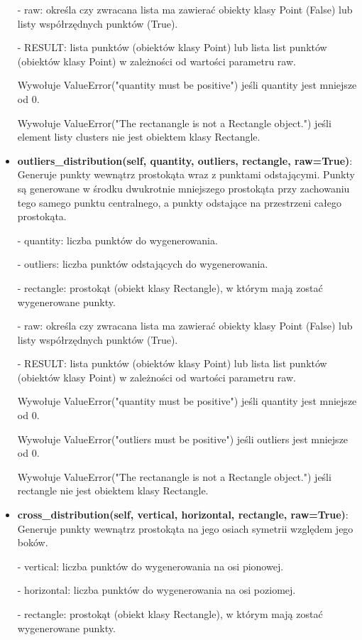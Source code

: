 \documentclass{lab}
\begin{document}
\begin{itemize}
  - raw: określa czy zwracana lista ma zawierać obiekty klasy Point (False) lub listy współrzędnych punktów (True).

  - RESULT: lista punktów (obiektów klasy Point) lub lista list punktów (obiektów klasy Point) w zależności od wartości parametru raw.

  Wywołuje ValueError("quantity must be positive") jeśli quantity jest mniejsze od 0.

  Wywołuje ValueError("The rectanangle is not a Rectangle object.") jeśli element listy clusters nie jest obiektem klasy Rectangle.

  \item \textbf{outliers\_distribution(self, quantity, outliers, rectangle, raw=True)}:
  Generuje punkty wewnątrz prostokąta wraz z punktami odstającymi. Punkty są generowane w środku dwukrotnie mniejszego prostokąta przy zachowaniu tego samego punktu centralnego, a punkty odstające na przestrzeni całego prostokąta.

  - quantity: liczba punktów do wygenerowania.

  - outliers: liczba punktów odstających do wygenerowania.

  - rectangle: prostokąt (obiekt klasy Rectangle), w którym mają zostać wygenerowane punkty.

  - raw: określa czy zwracana lista ma zawierać obiekty klasy Point (False) lub listy współrzędnych punktów (True).

  - RESULT: lista punktów (obiektów klasy Point) lub lista list punktów (obiektów klasy Point) w zależności od wartości parametru raw.

  Wywołuje ValueError("quantity must be positive") jeśli quantity jest mniejsze od 0.

  Wywołuje ValueError("outliers must be positive") jeśli outliers jest mniejsze od 0.

  Wywołuje ValueError("The rectanangle is not a Rectangle object.") jeśli rectangle nie jest obiektem klasy Rectangle.

  \item \textbf{cross\_distribution(self, vertical, horizontal, rectangle, raw=True)}:
  Generuje punkty wewnątrz prostokąta na jego osiach symetrii względem jego boków.

  - vertical: liczba punktów do wygenerowania na osi pionowej.

  - horizontal: liczba punktów do wygenerowania na osi poziomej.

  - rectangle: prostokąt (obiekt klasy Rectangle), w którym mają zostać wygenerowane punkty.


\end{itemize}
\end{document}
